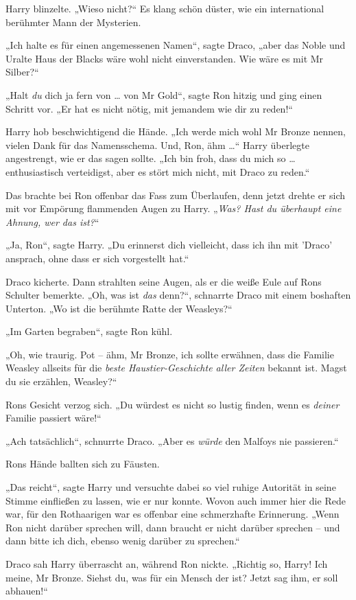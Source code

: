 {Harry blinzelte. „Wieso nicht?“ Es klang schön düster, wie ein international berühmter Mann der Mysterien.

„Ich halte es für einen angemessenen Namen“, sagte Draco, „aber das Noble und Uralte Haus der Blacks wäre wohl nicht einverstanden. Wie wäre es mit Mr Silber?“

„Halt \emph{du} dich ja fern von … von Mr Gold“, sagte Ron hitzig und ging einen Schritt vor. „Er hat es nicht nötig, mit jemandem wie dir zu reden!“

Harry hob beschwichtigend die Hände. „Ich werde mich wohl Mr Bronze nennen, vielen Dank für das Namensschema. Und, Ron, ähm …“ Harry überlegte angestrengt, wie er das sagen sollte. „Ich bin froh, dass du mich so … enthusiastisch verteidigst, aber es stört mich nicht, mit Draco zu reden.“

Das brachte bei Ron offenbar das Fass zum Überlaufen, denn jetzt drehte er sich mit vor Empörung flammenden Augen zu Harry. „\emph{Was? Hast du überhaupt eine Ahnung, wer das ist?}“

„Ja, Ron“, sagte Harry. „Du erinnerst dich vielleicht, dass ich ihn mit 'Draco' ansprach, ohne dass er sich vorgestellt hat.“

Draco kicherte. Dann strahlten seine Augen, als er die weiße Eule auf Rons Schulter bemerkte. „Oh, was ist \emph{das} denn?“, schnarrte Draco mit einem boshaften Unterton. „Wo ist die berühmte Ratte der Weasleys?“

„Im Garten begraben“, sagte Ron kühl.

„Oh, wie traurig. Pot -- ähm, Mr Bronze, ich sollte erwähnen, dass die Familie Weasley allseits für die \emph{beste Haustier-Geschichte aller Zeiten} bekannt ist. Magst du sie erzählen, Weasley?“

Rons Gesicht verzog sich. „Du würdest es nicht so lustig finden, wenn es \emph{deiner} Familie passiert wäre!“

„Ach tatsächlich“, schnurrte Draco. „Aber es \emph{würde} den Malfoys nie passieren.“

Rons Hände ballten sich zu Fäusten.

„Das reicht“, sagte Harry und versuchte dabei so viel ruhige Autorität in seine Stimme einfließen zu lassen, wie er nur konnte. Wovon auch immer hier die Rede war, für den Rothaarigen war es offenbar eine schmerzhafte Erinnerung. „Wenn Ron nicht darüber sprechen will, dann braucht er nicht darüber sprechen -- und dann bitte ich dich, ebenso wenig darüber zu sprechen.“

Draco sah Harry überrascht an, während Ron nickte. „Richtig so, Harry! Ich meine, Mr Bronze. Siehst du, was für ein Mensch der ist? Jetzt sag ihm, er soll abhauen!“

}
